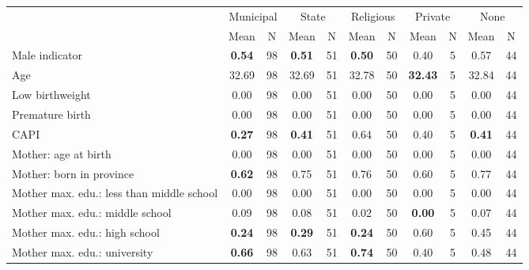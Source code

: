 \begin{tabular}{l c c c c c c c c c c}
\toprule
& \multicolumn{2}{c}{Municipal} & \multicolumn{2}{c}{State} & \multicolumn{2}{c}{Religious} & \multicolumn{2}{c}{Private} & \multicolumn{2}{c}{None} \\
& \scriptsize Mean & \scriptsize N & \scriptsize Mean & \scriptsize N & \scriptsize Mean & \scriptsize N & \scriptsize Mean & \scriptsize N & \scriptsize Mean & \scriptsize N \\
\midrule
Male indicator & \textbf{     0.54} &        98 & \textbf{     0.51} &        51 & \textbf{     0.50} &        50 &      0.40 &         5 &      0.57 &        44 \\
Age &     32.69 &        98 &     32.69 &        51 &     32.78 &        50 & \textbf{    32.43} &         5 &     32.84 &        44 \\
Low birthweight &      0.00 &        98 &      0.00 &        51 &      0.00 &        50 &      0.00 &         5 &      0.00 &        44 \\
Premature birth &      0.00 &        98 &      0.00 &        51 &      0.00 &        50 &      0.00 &         5 &      0.00 &        44 \\
CAPI & \textbf{     0.27} &        98 & \textbf{     0.41} &        51 &      0.64 &        50 &      0.40 &         5 & \textbf{     0.41} &        44 \\
Mother: age at birth &      0.00 &        98 &      0.00 &        51 &      0.00 &        50 &      0.00 &         5 &      0.00 &        44 \\
Mother: born in province & \textbf{     0.62} &        98 &      0.75 &        51 &      0.76 &        50 &      0.60 &         5 &      0.77 &        44 \\
Mother max. edu.: less than middle school &      0.00 &        98 &      0.00 &        51 &      0.00 &        50 &      0.00 &         5 &      0.00 &        44 \\
Mother max. edu.: middle school &      0.09 &        98 &      0.08 &        51 &      0.02 &        50 & \textbf{     0.00} &         5 &      0.07 &        44 \\
Mother max. edu.: high school & \textbf{     0.24} &        98 & \textbf{     0.29} &        51 & \textbf{     0.24} &        50 &      0.60 &         5 &      0.45 &        44 \\
Mother max. edu.: university & \textbf{     0.66} &        98 &      0.63 &        51 & \textbf{     0.74} &        50 &      0.40 &         5 &      0.48 &        44 \\

\end{tabular}
